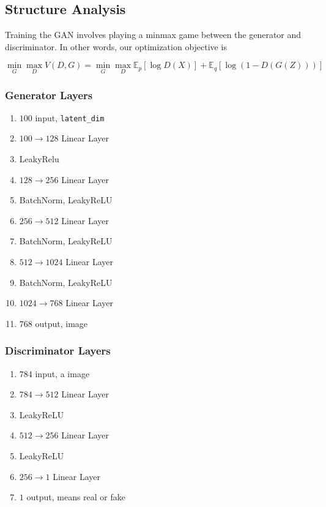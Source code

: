 \documentclass{article}
\begin{document}
\subsection{Structure Analysis}

Training the GAN involves playing a minmax game between the generator and
discriminator. In other words, our optimization objective is

\begin{equation}
    \min\limits_{G} \max\limits_{D}V(D,G)=
    \min\limits_{G} \max\limits_{D}\mathbb{E}_{p}[\log{D(X)}] + \mathbb{E}_{q}[\log{(1-D(G(Z)))}]
\end{equation}

\subsubsection{Generator Layers}

\begin{enumerate}
    \item $100$ input, \texttt{latent\_dim}
    \item $100 \to 128 $ Linear Layer 
    \item LeakyRelu
    \item $128 \to 256 $ Linear Layer
    \item BatchNorm, LeakyReLU
    \item $256 \to 512 $ Linear Layer
    \item BatchNorm, LeakyReLU
    \item $512 \to 1024$ Linear Layer
    \item BatchNorm, LeakyReLU
    \item $1024 \to 768$ Linear Layer
    \item $768$ output, image
\end{enumerate}

\subsubsection{Discriminator Layers}

\begin{enumerate}
    \item $784$ input, a image
    \item $784 \to 512 $ Linear Layer 
    \item LeakyReLU
    \item $512 \to 256 $ Linear Layer
    \item LeakyReLU
    \item $256 \to 1 $ Linear Layer
    \item $1$ output, means real or fake
\end{enumerate}
\end{document}
